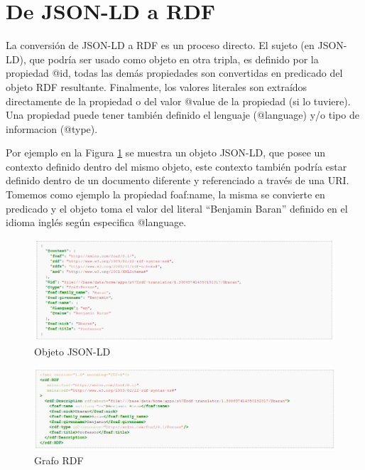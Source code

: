 \section{De JSON-LD a RDF}

La conversión de JSON-LD a RDF es un proceso directo. El sujeto (en JSON-LD), que podría ser usado como objeto en otra tripla, es definido por la propiedad @id, todas las demás propiedades son convertidas en predicado del objeto RDF resultante. Finalmente, los valores literales son extraídos directamente de la propiedad o del valor @value de la propiedad (si lo tuviere). Una propiedad puede tener también definido el lenguaje (@language) y/o tipo de informacion (@type).

Por ejemplo en la Figura \ref{img:EjemploBaranJSONLD} se muestra un objeto JSON-LD, que posee un contexto definido dentro del mismo objeto, este contexto también podría estar definido dentro de un documento diferente y referenciado a través de una URI. Tomemos como ejemplo la propiedad foaf:name, la misma se convierte en predicado y el objeto toma el valor del literal “Benjamin Baran” definido en el idioma inglés según especifica @language.



\begin{figure}[h!]
    \centering
    \includegraphics[width=150mm]{figuras/BaranJSONLD.png}
    \caption{Objeto JSON-LD}
    \label{img:EjemploBaranJSONLD}
    \end{figure}




\begin{figure}[h!]
    \centering
    \includegraphics[width=150mm]{figuras/BaranRDF.png}
    \caption{Grafo RDF}
    \label{img:EjemploBaranRDF}
    \end{figure}




